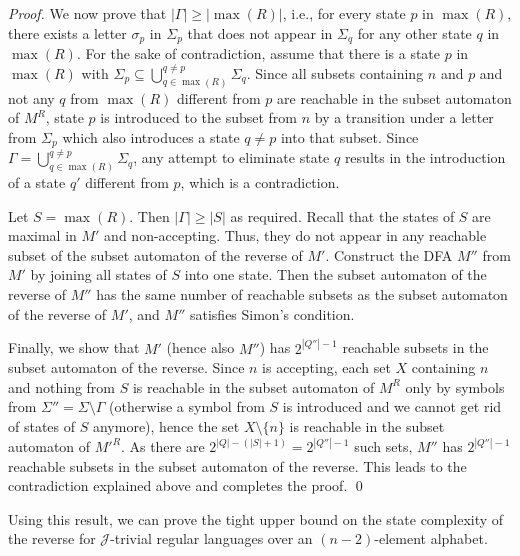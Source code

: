 \documentclass[runningheads]{llncs}
\newcommand{\J}{$\mathcal{J}$}
\begin{document}
\begin{proof}
    We now prove that $|\Gamma|\ge |\max(R)|$, i.e., for every state $p$ in $\max(R)$,
    there exists a letter $\sigma_p$ in $\Sigma_p$
    that does not appear in $\Sigma_q$ for any other state $q$ in $\max(R)$.
    For the sake of contradiction,
    assume that there is a state $p$ in $\max(R)$ with $\Sigma_{p}\subseteq\bigcup_{q\in\max(R)}^{q\neq p}\Sigma_{q}$.
Since all subsets containing $n$ and $p$ and not any $q$ from $\max(R)$
    different from $p$ are reachable in the subset automaton of $M^R$,
    state $p$ is introduced to the subset from $n$
    by a transition under a letter from $\Sigma_p$
    which also introduces a state $q\neq p$ into that subset.
    Since $\Gamma=\bigcup_{q\in\max(R)}^{q\neq p}\Sigma_{q}$, 
    any attempt to eliminate state $q$ results in the introduction of a state $q'$ different from $p$, which is a contradiction.




    Let $S=\max(R)$. Then $|\Gamma|\ge |S|$ as required.
    Recall that the states of $S$ are maximal in $M'$ and non-accepting.
    Thus, they do not appear in any reachable subset of the subset automaton of the reverse of $M'$.
Construct the DFA $M''$ from $M'$
    by joining all states of $S$ into one state.
    Then the subset automaton of the reverse of $M''$
    has the same number of reachable subsets
    as the subset automaton of the reverse of $M'$,
    and $M''$ satisfies Simon's condition.

    Finally, we show that $M'$ (hence also $M''$) has $2^{|Q''|-1}$ reachable subsets in the subset automaton of the reverse.
    Since $n$ is accepting, each set $X$ containing $n$ and nothing from $S$ is reachable in the subset automaton of $M^R$ only by symbols from $\Sigma''=\Sigma\setminus\Gamma$ (otherwise a symbol from $S$ is introduced and we cannot get rid of states of $S$ anymore),
    hence the set $X\setminus\{n\}$ is reachable in the subset automaton of $M'^R$.
As there are $2^{|Q|-(|S|+1)}=2^{|Q''|-1}$ such sets, $M''$ has $2^{|Q''|-1}$ reachable subsets in the subset automaton of the reverse.
    This leads to the contradiction explained above and completes the proof.
  \qed\end{proof}
  
  Using this result, we can prove the tight upper bound 
  on the state complexity of the reverse 
  for \J-trivial regular languages over an $(n-2)$-element alphabet.
\end{document}
